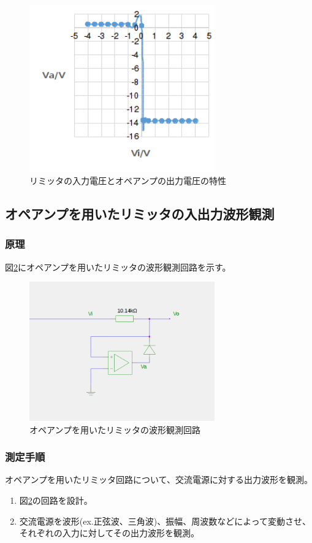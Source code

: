 \documentclass[11pt,a4j]{jsarticle}
\begin{document}
   \begin{figure}[htbp]
  \centering
  \includegraphics[width=8cm,clip]{1_1_amp_PS_ViVa.png}
  \caption{リミッタの入力電圧とオペアンプの出力電圧の特性}
  \label{fig:1_1_amp_PS_ViVa}
 \end{figure}%
    
    
  \subsection{オペアンプを用いたリミッタの入出力波形観測}
   \subsubsection{原理}
    
    図\ref{fig:amp_wave}にオペアンプを用いたリミッタの波形観測回路を示す。
    
    \begin{figure}[htbp]
  \centering
  \includegraphics[width=8cm,clip]{amp_wave.png}
  \caption{オペアンプを用いたリミッタの波形観測回路}
  \label{fig:amp_wave}
 \end{figure}%
    
   \subsubsection{測定手順}
    オペアンプを用いたリミッタ回路について、交流電源に対する出力波形を観測。
    \begin{enumerate}
    \item 図\ref{fig:amp_wave}の回路を設計。
    \item 交流電源を波形(ex.正弦波、三角波)、振幅、周波数などによって変動させ、それぞれの入力に対してその出力波形を観測。
    \end{enumerate}
    
\end{document}
